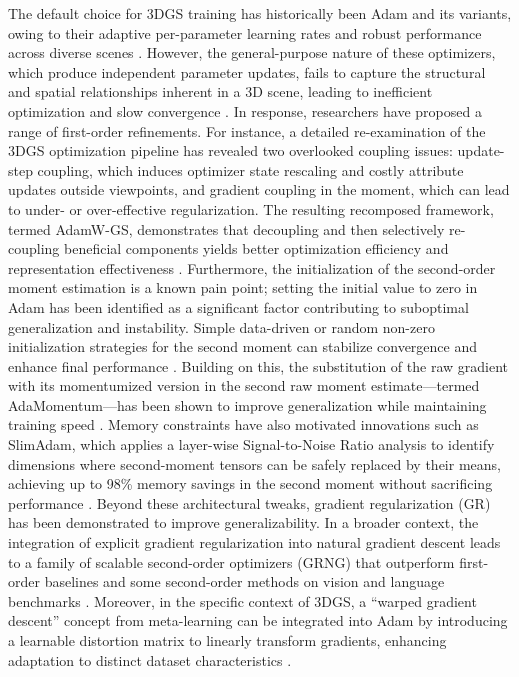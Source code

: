 \documentclass[11pt]{article}
\begin{document}
The default choice for 3DGS training has historically been Adam and its variants, owing to their adaptive per-parameter learning rates and robust performance across diverse scenes \cite{ref146}. However, the general-purpose nature of these optimizers, which produce independent parameter updates, fails to capture the structural and spatial relationships inherent in a 3D scene, leading to inefficient optimization and slow convergence \cite{ref147}. In response, researchers have proposed a range of first-order refinements. For instance, a detailed re-examination of the 3DGS optimization pipeline has revealed two overlooked coupling issues: update-step coupling, which induces optimizer state rescaling and costly attribute updates outside viewpoints, and gradient coupling in the moment, which can lead to under- or over-effective regularization. The resulting recomposed framework, termed AdamW-GS, demonstrates that decoupling and then selectively re-coupling beneficial components yields better optimization efficiency and representation effectiveness \cite{ref148}. Furthermore, the initialization of the second-order moment estimation is a known pain point; setting the initial value to zero in Adam has been identified as a significant factor contributing to suboptimal generalization and instability. Simple data-driven or random non-zero initialization strategies for the second moment can stabilize convergence and enhance final performance \cite{ref149}. Building on this, the substitution of the raw gradient with its momentumized version in the second raw moment estimate---termed AdaMomentum---has been shown to improve generalization while maintaining training speed \cite{ref150}. Memory constraints have also motivated innovations such as SlimAdam, which applies a layer-wise Signal-to-Noise Ratio analysis to identify dimensions where second-moment tensors can be safely replaced by their means, achieving up to 98\% memory savings in the second moment without sacrificing performance \cite{ref151}. Beyond these architectural tweaks, gradient regularization (GR) has been demonstrated to improve generalizability. In a broader context, the integration of explicit gradient regularization into natural gradient descent leads to a family of scalable second-order optimizers (GRNG) that outperform first-order baselines and some second-order methods on vision and language benchmarks \cite{ref152}. Moreover, in the specific context of 3DGS, a ``warped gradient descent'' concept from meta-learning can be integrated into Adam by introducing a learnable distortion matrix to linearly transform gradients, enhancing adaptation to distinct dataset characteristics \cite{ref153}.
\end{document}
